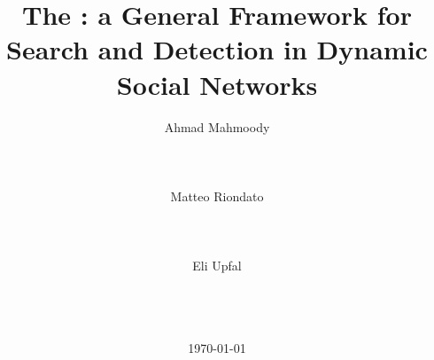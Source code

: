 \documentclass{sig-alternate-2013}
\newif\ifacmstyle
\begin{document}
\ifacmstyle
\newfont{\mycrnotice}{ptmr8t at 7pt}
\newfont{\myconfname}{ptmri8t at 7pt}
\let\crnotice\mycrnotice%
\let\confname\myconfname%

\CopyrightYear{2016}
\permission{Permission to make digital or hard copies of all or part of this
work for personal or classroom use is granted without fee provided that copies
are not made or distributed for profit or commercial advantage and that copies
bear this notice and the full citation on the first page. Copyrights for
components of this work owned by others than ACM must be honored. Abstracting
with credit is permitted. To copy otherwise, or republish, to post on servers or
to redistribute to lists, requires prior specific permission and/or a fee.
Request permissions from Permissions@acm.org.}
\conferenceinfo{WSDM'16,}{February 22--25, 2016, San Francisco, CA, USA}
\copyrightetc{\copyright~2016 ACM. ISBN \the\acmcopyr}
\crdata{XXX-X-XXXX-XXXX-X/16/02\ ...\$15.00.\\
DOI: http://dx.doi.org/XX.XXXX/XXXXXXX.XXXXXXX
}

\clubpenalty=10000
\widowpenalty = 10000
\fi

\title{The \probname: a General Framework for Search and Detection in Dynamic
Social Networks}

\author{
\alignauthor
Ahmad Mahmoody\\
\\
\\
\\
\alignauthor
Matteo Riondato\\
\\
\\
\\
\alignauthor
Eli Upfal\\
\\
\\
\\
}

\date{\today}

\maketitle
\end{document}

